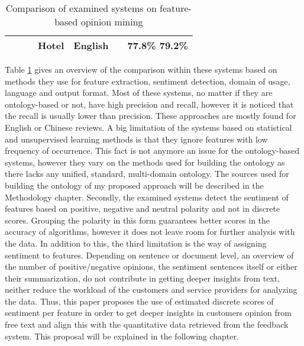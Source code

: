 \begin{table}[h!]
\begin{tabular}{|m{1.7cm}||m{2.4cm}|m{2.6cm}|m{1.15cm}|m{1.15cm}|m{2.85cm}| m{0.8cm}|}
\centering  {The proposed approach} & \centering {Ontology-based \& lexicon-based (WordNet)} & \centering  {Rule-based and lexicon based (VADER)} & {Hotel} & {English} & \centering {Matrix of discrete scores per each sentence and features} & {77.8\% 79.2\%} \\ \hline
\end{tabular}
\caption{Comparison of examined systems on feature-based opinion mining}
\label{comparison}
\end{table}


Table \ref{comparison} gives an overview of the comparison within these systems based on methods they use for feature extraction, sentiment detection, domain of usage, language and output format. Most of these systems, no matter if they are ontology-based or not, have high precision and recall, however it is noticed that the recall is usually lower than precision. These approaches are mostly found for English or Chinese reviews. A big limitation of the systems based on statistical and unsupervised learning methods is that they ignore features with low frequency of occurrence. This fact is not anymore an issue for the ontology-based systems, however they vary on the methods used for building the ontology as there lacks any unified, standard, multi-domain ontology. The sources used for building the ontology of my proposed approach will be described in the Methodology chapter.
Secondly, the examined systems detect the sentiment of features based on positive, negative and neutral polarity and not in discrete scores. Grouping the polarity in this form guarantees better scores in the accuracy of algorithms, however it does not leave room for further analysis with the data.
In addition to this, the third limitation is the way of assigning sentiment to features. Depending on sentence or document level, an overview of the number of positive/negative opinions, the sentiment sentences itself or either their summarization, do not contribute in getting deeper insights from text, neither reduce the workload of the customers and service providers for analyzing the data.
Thus, this paper proposes the use of estimated discrete scores of sentiment per feature in order to get deeper insights in customers opinion from free text and align this with the quantitative data retrieved from the feedback system. This proposal will be explained in the following chapter.
